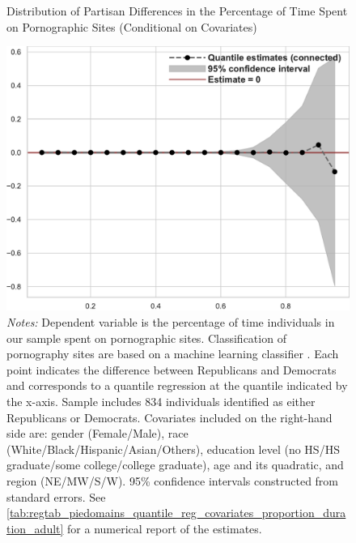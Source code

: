 \documentclass[12pt, letterpaper]{article}
\begin{document}
\begin{figure}[t]
	\centering
	\caption{Distribution of Partisan Differences in the Percentage of Time Spent on Pornographic Sites (Conditional on Covariates)}
	\includegraphics[width=.55\linewidth]{../figs/piedomains_quantile_reg_covariates_proportion_duration_adult.pdf}
	\caption*{\footnotesize \emph{Notes:} 
		Dependent variable is the percentage of time individuals in our sample spent on pornographic sites.
		Classification of pornography sites are based on a machine learning classifier \citep{Chintalapati_piedomains_Predict_the_2022}.
		Each point indicates the difference between Republicans and Democrats and corresponds to a quantile regression at the quantile indicated by the x-axis.
		Sample includes 834 individuals identified as either Republicans or Democrats.
		Covariates included on the right-hand side are: gender (Female/Male), race (White/Black/Hispanic/Asian/Others), education level (no HS/HS graduate/some college/college graduate), age and its quadratic, and region (NE/MW/S/W).
		95\% confidence intervals constructed from standard errors.
		See \cref{tab:regtab_piedomains_quantile_reg_covariates_proportion_duration_adult} for a numerical report of the estimates.
	}
	\label{fig:piedomains_quantile_reg_covariates_proportion_duration_adult}
\end{figure}
\end{document}
